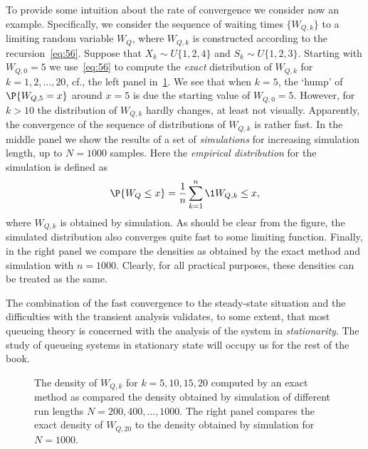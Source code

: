 To provide some intuition about the rate of convergence we consider now an example.
Specifically, we consider the sequence of waiting times $\{W_{Q,k}\}$ to a limiting random variable $W_Q$, where $W_{Q,k}$ is constructed according to the recursion~\cref{eq:56}.
Suppose that $X_k\sim U\{1,2,4\}$ and $S_k\sim U\{1,2,3\}$.
Starting with $W_{Q,0}=5$ we use~\cref{eq:56} to compute the \emph{exact} distribution of $W_{Q,k}$ for $k=1,2,\ldots, 20$, cf., the left panel in~\cref{fig:convergence}.
We see that when $k=5$, the `hump' of $\P{W_{Q,5}=x}$ around $x=5$ is due the starting value of $W_{Q,0}=5$.
However, for $k>10$ the distribution of $W_{Q,k}$ hardly changes, at least not visually.
Apparently, the convergence of the sequence of distributions of $W_{Q,k}$ is rather fast.
In the middle panel we show the results of a set of \emph{simulations} for increasing simulation length, up to $N=1000$ samples.
Here the \emph{empirical distribution} for the simulation is defined as
\begin{equation*}
\P{W_Q\leq x} = \frac 1n \sum_{k=1}^n \1{W_{Q,k} \leq x},
\end{equation*}
where $W_{Q,k}$ is obtained by simulation.
As should be clear from the figure, the simulated distribution also converges quite fast to some limiting function.
Finally, in the right panel we compare the densities as obtained by the exact method and simulation with $n=1000$.
Clearly, for all practical purposes, these densities can be treated as the same.

The combination of the fast convergence to the steady-state situation
and the difficulties with the transient analysis validates, to some
extent, that most queueing theory is concerned with the analysis of
the system in \emph{stationarity}. The study of queueing systems in
stationary state will occupy us for the rest of the book.

\begin{figure}
 \centering



 \caption{The density of $W_{Q,k}$ for $k=5, 10, 15, 20$ computed by
 an exact method as compared the density obtained by simulation of
 different run lengths $N=200, 400, \ldots, 1000$. The right panel
 compares the exact density of $W_{Q,20}$ to the density obtained by simulation
 for $N=1000$.}
\label{fig:convergence}
\end{figure}




